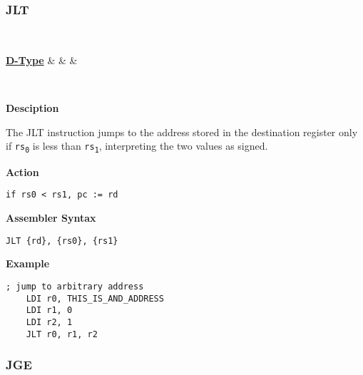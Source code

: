 \subsubsection{JLT }\label{sec:JLT}

\vspace{3ex}

\begin{center}
	\begin{bytefield}[leftcurly=., leftcurlyspace=0pt]{32}
		 \\
		\begin{leftwordgroup}{\hyperref[sec:r-type]{\textbf{D-Type}}}
		 & 
		 &
		 &
		\end{leftwordgroup}\\
	\end{bytefield}
\end{center}

\textbf{Desciption}

The JLT instruction jumps to the address stored in the destination register only if \texttt{rs\textsubscript{0}} is less than \texttt{rs\textsubscript{1}},
interpreting the two values as signed.

\vspace{3ex}

\textbf{Action}
\begin{lstlisting}[frame=single]
	if rs0 < rs1, pc := rd
\end{lstlisting}

\vspace{3ex}

\textbf{Assembler Syntax}
\begin{lstlisting}[frame=single]
	JLT {rd}, {rs0}, {rs1}
\end{lstlisting}

\vspace{3ex}

\textbf{Example}
\begin{lstlisting}[frame=single]
	; jump to arbitrary address
	LDI r0, THIS_IS_AND_ADDRESS
	LDI r1, 0
	LDI r2, 1
	JLT r0, r1, r2
\end{lstlisting}

\subsubsection{JGE }\label{sec:JGE}

